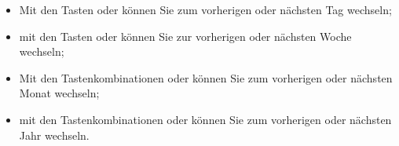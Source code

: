 \vspace{5mm}
\noindent
\begin{minipage}{.6\linewidth}
	\vspace{-15pt}
	\begin{itemize}[rightmargin=.6cm]
		\item Mit den Tasten \keys{\arrowkeyleft} oder \keys{\arrowkeyright} können Sie zum vorherigen oder nächsten Tag wechseln;
		\item mit den Tasten \keys{\arrowkeyup} oder \keys{\arrowkeydown} können Sie zur vorherigen oder nächsten Woche wechseln;
		\item Mit den Tastenkombinationen  oder  können Sie zum vorherigen oder nächsten Monat wechseln;
		\item mit den Tastenkombinationen  oder  können Sie zum vorherigen oder nächsten Jahr wechseln.
	\end{itemize}
\end{minipage}
\hspace{10pt}
